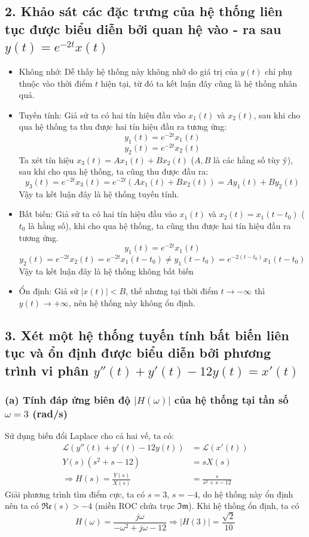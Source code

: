 \documentclass{article}
\begin{document}
\subsection*{2. Khảo sát các đặc trưng của hệ thống liên tục được biểu diễn bởi quan hệ vào - ra sau $y(t)=e^{-2t}x(t)$}
\begin{itemize}
    \item Không nhớ: Dễ thấy hệ thống này không nhớ do giá trị của $y(t)$ chỉ phụ thuộc vào thời điểm $t$ hiện tại, từ đó ta kết luận đây cũng là hệ thống nhân quả.
    \item Tuyến tính: Giả sử ta có hai tín hiệu đầu vào $x_{1}(t)$ và $x_{2}(t)$, sau khi cho qua hệ thống ta thu được hai tín hiệu đầu ra tương ứng:
    $$y_{1}(t)=e^{-2t}x_{1}(t)$$ $$y_{2}(t)=e^{-2t}x_{2}(t)$$
    Ta xét tín hiệu $x_{3}(t)=Ax_{1}(t)+Bx_{2}(t)$ ($A, B$ là các hằng số tùy ý), sau khi cho qua hệ thống, ta cũng thu được đầu ra:
    $$y_{3}(t)=e^{-2t}x_{3}(t)=e^{-2t}(Ax_{1}(t)+Bx_{2}(t))=Ay_{1}(t)+By_{2}(t)$$
    Vậy ta kết luận đây là hệ thống tuyến tính.
    \item Bất biến: Giả sử ta có hai tín hiệu đầu vào $x_{1}(t)$ và $x_{2}(t)=x_{1}(t-t_{0})$ ($t_{0}$ là hằng số), khi cho qua hệ thống, ta cũng thu được hai tín hiệu đầu ra tương ứng.
    $$y_{1}(t)=e^{-2t}x_{1}(t)$$
    $$y_{2}(t)=e^{-2t}x_{2}(t)=e^{-2t}x_{1}(t-t_{0})\neq y_{1}(t-t_{0})=e^{-2(t-t_{0})}x_{1}(t-t_{0})$$
    Vậy ta kết luận đây là hệ thống không bất biến
    \item Ổn định: Giả sử $|x(t)|<B$, thế nhưng tại thời điểm $t\to-\infty$ thì $y(t)\to+\infty$, nên hệ thống này không ổn định.
\end{itemize}
\subsection*{3. Xét một hệ thống tuyến tính bất biến liên tục và ổn định được biểu diễn bởi phương trình vi phân $y''(t)+y'(t)-12y(t)=x'(t)$}
\subsubsection*{(a) Tính đáp ứng biên độ $|H(\omega)|$ của hệ thống tại tần số $\omega=3$ (rad/s)}
Sử dụng biến đổi Laplace cho cả hai vế, ta có:
\begin{equation*}
    \begin{split}
    \mathscr{L}(y''(t)+y'(t)-12y(t))&=\mathscr{L}(x'(t))\\Y(s)(s^{2}+s-12)&=sX(s)
    \\\Rightarrow H(s)=\frac{Y(s)}{X(s)}&=\frac{s}{s^{2}+s-12}
    \end{split}
\end{equation*}
Giải phương trình tìm điểm cực, ta có $s=3$, $s=-4$, do hệ thống này ổn định nên ta có $\mathfrak{Re}(s)>-4$ (miền ROC chứa trục $\mathfrak{Im}$).
Khi hệ thống ổn định, ta có
$$H(\omega)=\frac{j\omega}{-\omega^{2}+j\omega-12}\Rightarrow |H(3)|=\frac{\sqrt{2}}{10}$$
\end{document}
